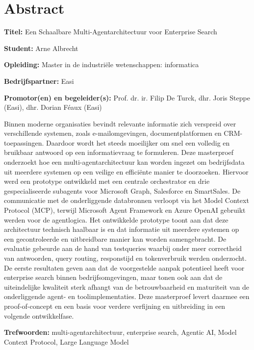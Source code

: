 \chapter*{Abstract}

\noindent\textbf{Titel:} Een Schaalbare Multi-Agent\-architectuur voor Enterprise Search\par
\noindent\textbf{Student:} Arne Albrecht\par
\noindent\textbf{Opleiding:} Master in de industriële wetenschappen: informatica\par
\noindent\textbf{Bedrijfspartner:} Easi\par
\noindent\textbf{Promotor(en) en begeleider(s):} Prof. dr. ir. Filip De Turck, dhr. Joris Steppe (Easi), dhr. Dorian Féaux (Easi)

\vspace{1em}

\noindent Binnen moderne organisaties bevindt relevante informatie zich verspreid over verschillende systemen, zoals e-mailomgevingen, documentplatformen en CRM-toepassingen. Daardoor wordt het steeds moeilijker om snel een volledig en bruikbaar antwoord op een informatievraag te formuleren. Deze masterproef onderzoekt hoe een multi-agent\-architectuur kan worden ingezet om bedrijfsdata uit meerdere systemen op een veilige en efficiënte manier te doorzoeken. Hiervoor werd een prototype ontwikkeld met een centrale orchestrator en drie gespecialiseerde subagents voor Microsoft Graph, Salesforce en SmartSales. De communicatie met de onderliggende databronnen verloopt via het Model Context Protocol (MCP), terwijl Microsoft Agent Framework en Azure OpenAI gebruikt werden voor de agentlogica. Het ontwikkelde prototype toont aan dat deze architectuur technisch haalbaar is en dat informatie uit meerdere systemen op een gecontroleerde en uitbreidbare manier kan worden samengebracht. De evaluatie gebeurde aan de hand van testqueries waarbij onder meer correctheid van antwoorden, query routing, responstijd en tokenverbruik werden onderzocht. De eerste resultaten geven aan dat de voorgestelde aanpak potentieel heeft voor enterprise search binnen bedrijfsomgevingen, maar tonen ook aan dat de uiteindelijke kwaliteit sterk afhangt van de betrouwbaarheid en maturiteit van de onderliggende agent- en toolimplementaties. Deze masterproef levert daarmee een proof-of-concept en een basis voor verdere verfijning en uitbreiding in een volgende ontwikkelfase.

\vspace{1em}

\noindent\textbf{Trefwoorden:} multi-agent\-architectuur, enterprise search, Agentic AI, Model Context Protocol, Large Language Model